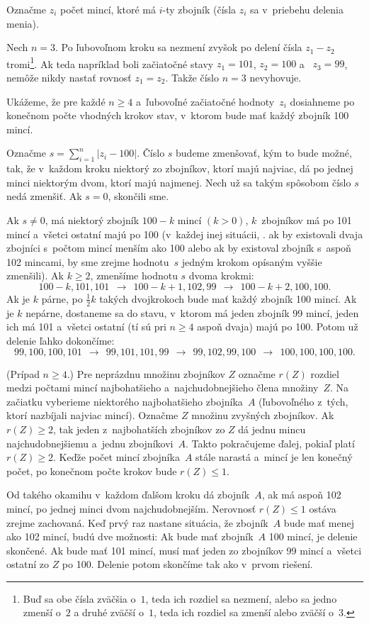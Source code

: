 {%
Označme $z_i$ počet mincí, ktoré má $i$-ty zbojník (čísla $z_i$ sa v~priebehu delenia menia).

Nech $n=3$. Po ľubovoľnom kroku sa nezmení zvyšok po delení čísla $z_1-z_2$ tromi\footnote{Buď sa obe čísla zväčšia o~$1$, teda ich rozdiel sa nezmení, alebo sa jedno zmenší o~$2$ a druhé zväčší o~$1$, teda ich rozdiel sa zmenší alebo zväčší o~$3$.}. Ak teda napríklad boli začiatočné stavy $z_1=101$, $z_2=100$ a~ $z_3=99$, nemôže nikdy nastať rovnosť $z_1=z_2$. Takže číslo $n=3$ nevyhovuje.

Ukážeme, že pre každé $n\ge4$ a~ľubovoľné začiatočné hodnoty~$z_i$ dosiahneme po konečnom počte vhodných krokov stav, v~ktorom bude mať každý zbojník 100 mincí.

Označme $s=\sum_{i=1}^n |z_i-100|$. Číslo $s$ budeme zmenšovať, kým to bude možné, tak, že v~každom kroku niektorý zo zbojníkov, ktorí majú najviac, dá po jednej minci niektorým dvom, ktorí majú najmenej. Nech už sa takým spôsobom číslo $s$ nedá zmenšiť. Ak $s=0$, skončili sme.

Ak $s\ne0$, má niektorý zbojník $100-k$ mincí $(k>0)$, $k$~zbojníkov má po 101 mincí a~všetci ostatní majú po 100 (v~každej inej situácii, \tj. ak by existovali dvaja zbojníci s~počtom mincí menším ako 100 alebo ak by existoval zbojník s~aspoň 102 mincami, by sme zrejme hodnotu~$s$ jedným krokom opísaným vyššie zmenšili). Ak $k\ge2$, zmenšíme hodnotu $s$ dvoma krokmi:
$$
100-k,101,101\ \ \longrightarrow\ \ 100-k+1,102,99\ \ \longrightarrow\ \ 100-k+2,100,100.
$$
Ak je $k$ párne, po $\frac12k$ takých dvojkrokoch bude mať každý zbojník 100 mincí. Ak je $k$ nepárne, dostaneme sa do stavu, v~ktorom má jeden zbojník 99 mincí, jeden ich má 101 a~všetci ostatní (tí sú pri $n\ge4$ aspoň dvaja) majú po 100. Potom už delenie ľahko dokončíme:
$$
99,100,100,101\ \ \longrightarrow\ \ 99,101,101,99\ \ \longrightarrow\ \ 99,102,99,100\ \ \longrightarrow\ \ 100,100,100,100.
$$

\ineriesenie (Prípad $n\ge4$.)
Pre neprázdnu množinu zbojníkov $Z$ označme $r(Z)$ rozdiel medzi počtami mincí najbohatšieho a~najchudobnejšieho člena množiny~$Z$. Na začiatku vyberieme niektorého najbohatšieho zbojníka~$A$ (ľubovoľného z~tých, ktorí nazbíjali najviac mincí). Označme $Z$ množinu zvyšných zbojníkov. Ak $r(Z)\ge2$, tak jeden z~najbohatších zbojníkov zo $Z$ dá jednu mincu najchudobnejšiemu a~jednu zbojníkovi~$A$. Takto pokračujeme ďalej, pokiaľ platí $r(Z)\ge2$. Keďže počet mincí zbojníka~$A$ stále narastá a~mincí je len konečný počet, po konečnom počte krokov bude $r(Z)\le1$.

Od takého okamihu v~každom ďalšom kroku dá zbojník~$A$, ak má aspoň 102 mincí, po jednej minci dvom najchudobnejším. Nerovnosť $r(Z)\le1$ ostáva zrejme zachovaná. Keď prvý raz nastane situácia, že zbojník~$A$ bude mať menej ako 102 mincí, budú dve možnosti: Ak bude mať zbojník~$A$ 100 mincí, je delenie skončené. Ak bude mať 101 mincí, musí mať jeden zo zbojníkov 99 mincí a~všetci ostatní zo $Z$ po 100. Delenie potom skončíme tak ako v~prvom riešení.
}

